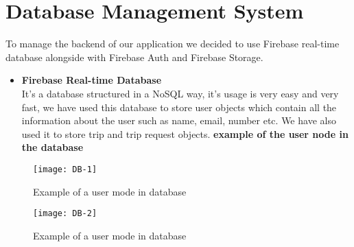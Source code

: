 \section{Database Management System}
To manage the backend of our application we decided to use Firebase real-time database alongside with Firebase Auth and Firebase Storage. 
\begin{itemize}
\item \textbf{Firebase Real-time Database }\\

It’s a database structured in a NoSQL way, it’s usage is very easy and very fast, we have used this database to store user objects which contain all the information about the user such as name, email, number etc. We have also used it to store trip and trip request objects.
\textbf{example of the user node in the database}
\end{itemize}
\begin{figure}[ht]
\center
\texttt{[image: DB-1]} 
\caption{Example of a user mode in database}
\label{fig:Example of a user mode in database}
\end{figure}
\begin{figure}[ht]
\center
\texttt{[image: DB-2]} 
\caption{Example of a user mode in database}
\label{fig:Example of a user mode in database}
\end{figure}
